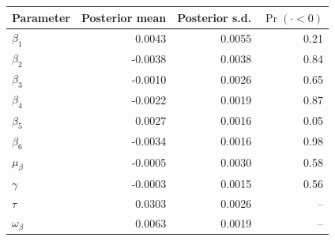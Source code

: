 \begin{tabular}{lrrr}
\toprule
Parameter & Posterior mean & Posterior s.d. & $\Pr(\cdot<0)$ \\
\midrule
$\beta_1$ & 0.0043 & 0.0055 & 0.21 \\
$\beta_2$ & -0.0038 & 0.0038 & 0.84 \\
$\beta_3$ & -0.0010 & 0.0026 & 0.65 \\
$\beta_4$ & -0.0022 & 0.0019 & 0.87 \\
$\beta_5$ & 0.0027 & 0.0016 & 0.05 \\
$\beta_6$ & -0.0034 & 0.0016 & 0.98 \\
$\mu_\beta$ & -0.0005 & 0.0030 & 0.58 \\
$\gamma$ & -0.0003 & 0.0015 & 0.56 \\
$\tau$ & 0.0303 & 0.0026 & -- \\
$\omega_\beta$ & 0.0063 & 0.0019 & -- \\
\bottomrule
\end{tabular}
